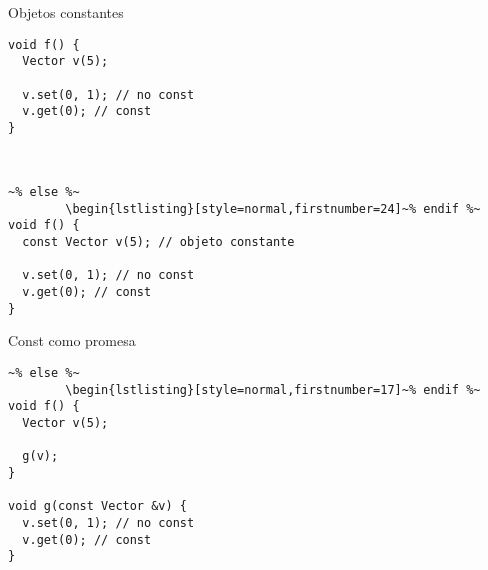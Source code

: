 \begin{frame}[fragile]{Objetos constantes}
        \begin{lstlisting}[style=normal,firstnumber=17]
void f() {
  Vector v(5);

  v.set(0, 1); // no const
  v.get(0); // const
}

        \end{lstlisting}
        \pause
                   ~%
        \begin{lstlisting}[style=normal,firstnumber=24,linebackgroundcolor={%
                 \btLstHLR<2>{27}%
         }]~% else %~
        \begin{lstlisting}[style=normal,firstnumber=24]~% endif %~
void f() {
  const Vector v(5); // objeto constante

  v.set(0, 1); // no const
  v.get(0); // const
}
        \end{lstlisting}
\end{frame}

\begin{frame}[fragile]{Const como promesa}
                   ~%
        \begin{lstlisting}[style=normal,firstnumber=17,linebackgroundcolor={%
                 \btLstHLB<1>{23}%
                 \btLstHLR<1>{24}%
         }]~% else %~
        \begin{lstlisting}[style=normal,firstnumber=17]~% endif %~
void f() {
  Vector v(5);

  g(v);
}

void g(const Vector &v) {
  v.set(0, 1); // no const
  v.get(0); // const
}
        \end{lstlisting}
\end{frame}

